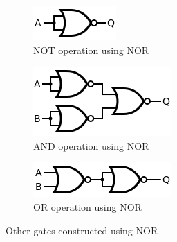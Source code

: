 \begin{figure}[H]
    \centering
    \begin{subfigure}[b]{0.2\textwidth}
        \centering
        \includegraphics[width=\textwidth]{images/nor_not.png}
        \caption{NOT operation using NOR}
    \end{subfigure}
    \hfill
    \begin{subfigure}[b]{0.2\textwidth}
        \centering
        \includegraphics[width=\textwidth]{images/nor_and.png}
        \caption{AND operation using NOR}
    \end{subfigure}
    \hfill
    \begin{subfigure}[b]{0.2\textwidth}
        \centering
        \includegraphics[width=\textwidth]{images/nor_or.png}
        \caption{OR operation using NOR}
    \end{subfigure}
    \hfill
       \caption{Other gates constructed using NOR}
       \label{nor}
\end{figure}

